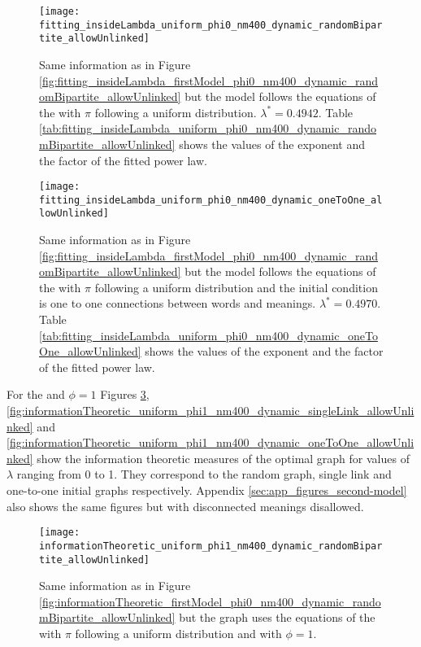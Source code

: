 \begin{figure}
  \centering
  \texttt{[image: fitting\_insideLambda\_uniform\_phi0\_nm400\_dynamic\_randomBipartite\_allowUnlinked]}
  \caption{Same information as in Figure \ref{fig:fitting_insideLambda_firstModel_phi0_nm400_dynamic_randomBipartite_allowUnlinked} but the model follows the equations of the \secondmodel{} with $\pi$ following a uniform distribution. $\lambda^*=0.4942$.
Table \ref{tab:fitting_insideLambda_uniform_phi0_nm400_dynamic_randomBipartite_allowUnlinked} shows the values of the exponent and the factor of the fitted power law.}
  \label{fig:fitting_insideLambda_uniform_phi0_nm400_dynamic_randomBipartite_allowUnlinked}
\end{figure}

\begin{figure}
  \centering
  \texttt{[image: fitting\_insideLambda\_uniform\_phi0\_nm400\_dynamic\_oneToOne\_allowUnlinked]}
  \caption{Same information as in Figure \ref{fig:fitting_insideLambda_firstModel_phi0_nm400_dynamic_randomBipartite_allowUnlinked} but the model follows the equations of the \secondmodel{} with $\pi$ following a uniform distribution and the initial condition is one to one connections between words and meanings. $\lambda^*=0.4970$.
Table \ref{tab:fitting_insideLambda_uniform_phi0_nm400_dynamic_oneToOne_allowUnlinked} shows the values of the exponent and the factor of the fitted power law.}
  \label{fig:fitting_insideLambda_uniform_phi0_nm400_dynamic_oneToOne_allowUnlinked}
\end{figure}





For the \secondmodel{} and $\phi=1$ Figures \ref{fig:informationTheoretic_uniform_phi1_nm400_dynamic_randomBipartite_allowUnlinked},  \ref{fig:informationTheoretic_uniform_phi1_nm400_dynamic_singleLink_allowUnlinked} and \ref{fig:informationTheoretic_uniform_phi1_nm400_dynamic_oneToOne_allowUnlinked} show the information theoretic measures of the optimal graph for values of $\lambda$ ranging from 0 to 1.
They correspond to the random graph, single link and one-to-one initial graphs respectively.
Appendix \ref{sec:app_figures_second-model} also shows the same figures but with disconnected meanings disallowed.

\begin{figure}
  \centering
  \texttt{[image: informationTheoretic\_uniform\_phi1\_nm400\_dynamic\_randomBipartite\_allowUnlinked]}
  \caption{Same information as in Figure \ref{fig:informationTheoretic_firstModel_phi0_nm400_dynamic_randomBipartite_allowUnlinked} but the graph uses the equations of the \secondmodel{} with $\pi$ following a uniform distribution and with $\phi=1$.}
  \label{fig:informationTheoretic_uniform_phi1_nm400_dynamic_randomBipartite_allowUnlinked}
\end{figure}

